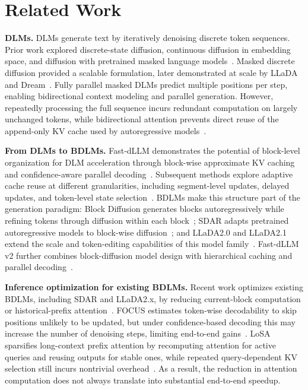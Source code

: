 \section{Related Work}

\textbf{DLMs.}
DLMs generate text by iteratively denoising discrete token sequences. Prior work explored discrete-state diffusion, continuous diffusion in embedding space, and diffusion with pretrained masked language models~\citep{austin2021structured,li2022diffusionlm,he2023diffusionbert}. Masked discrete diffusion provided a scalable formulation, later demonstrated at scale by LLaDA and Dream~\citep{sahoo2024simple,nie2025neurips-large,ye2025dream}. Fully parallel masked DLMs predict multiple positions per step, enabling bidirectional context modeling and parallel generation. However, repeatedly processing the full sequence incurs redundant computation on largely unchanged tokens, while bidirectional attention prevents direct reuse of the append-only KV cache used by autoregressive models~\citep{wu2025fastdllm,liu2025dllmcache}.

\textbf{From DLMs to BDLMs.}
Fast-dLLM demonstrates the potential of block-level organization for DLM acceleration through block-wise approximate KV caching and confidence-aware parallel decoding~\citep{wu2025fastdllm}. Subsequent methods explore adaptive cache reuse at different granularities, including segment-level updates, delayed updates, and token-level state selection~\citep{liu2025dllmcache,ma2025dkvcache,jiang2025d2cache}. BDLMs make this structure part of the generation paradigm: Block Diffusion generates blocks autoregressively while refining tokens through diffusion within each block~\citep{arriola2025iclr-block}; SDAR adapts pretrained autoregressive models to block-wise diffusion~\citep{cheng2025sdar}; and LLaDA2.0 and LLaDA2.1 extend the scale and token-editing capabilities of this model family~\citep{nie2025llada20,bie2026llada21speedingtextdiffusion}. Fast-dLLM v2 further combines block-diffusion model design with hierarchical caching and parallel decoding~\citep{wu2025fastdllmv2}.

\textbf{Inference optimization for existing BDLMs.}
Recent work optimizes existing BDLMs, including SDAR and LLaDA2.x, by reducing current-block computation or historical-prefix attention~\citep{liang2026focus,xi2026losa}. FOCUS estimates token-wise decodability to skip positions unlikely to be updated, but under confidence-based decoding this may increase the number of denoising steps, limiting end-to-end gains~\citep{liang2026focus}. LoSA sparsifies long-context prefix attention by recomputing attention for active queries and reusing outputs for stable ones, while repeated query-dependent KV selection still incurs nontrivial overhead~\citep{xi2026losa}. As a result, the reduction in attention computation does not always translate into substantial end-to-end speedup.